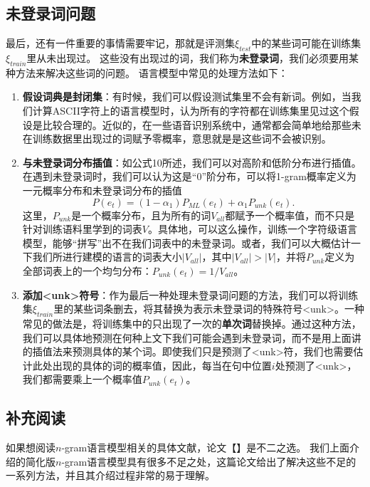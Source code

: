 \documentclass[10pt,a4paper]{ctexart}
\begin{document}
\subsection{未登录词问题}
最后，还有一件重要的事情需要牢记，那就是评测集$\xi_{test}$中的某些词可能在训练集$\xi_{train}$里从未出现过。
这些没有出现过的词，我们称为\textbf{未登录词}，我们必须要用某种方法来解决这些词的问题。
语言模型中常见的处理方法如下：
\begin{enumerate}
\item[] \textbf{假设词典是封闭集}：有时候，我们可以假设测试集里不会有新词。例如，当我们计算ASCII字符上的语言模型时，认为所有的字符都在训练集里见过这个假设是比较合理的。近似的，在一些语音识别系统中，通常都会简单地给那些未在训练数据里出现过的词赋予零概率，意思就是是这些词不会被识别。
\item[] \textbf{与未登录词分布插值}：如公式10所述，我们可以对高阶和低阶分布进行插值。在遇到未登录词时，我们可以认为这是“0”阶分布，可以将1-gram概率定义为一元概率分布和未登录词分布的插值\[ P(e_t) = (1 - \alpha_1)P_{ML}(e_t) + \alpha_1 P_{unk}(e_t).\]这里，$P_{unk}$是一个概率分布，且为所有的词$V_{all}$都赋予一个概率值，而不只是针对训练语料里学到的词表$V$。具体地，可以这么操作，训练一个字符级语言模型，能够“拼写”出不在我们词表中的未登录词。或者，我们可以大概估计一下我们所进行建模的语言的词表大小$|V_{all}|$，其中$|V_{all}| > |V|$，并将$P_{unk}$定义为全部词表上的一个均匀分布：$P_{unk}(e_t) = 1 / {V_{all}}$。
\item[] \textbf{添加<unk>符号}：作为最后一种处理未登录词问题的方法，我们可以将训练集$\xi_{train}$里的某些词条删去，将其替换为表示未登录词的特殊符号<unk>。一种常见的做法是，将训练集中的只出现了一次的\textbf{单次词}替换掉。通过这种方法，我们可以具体地预测在何种上文下我们可能会遇到未登录词，而不是用上面讲的插值法来预测具体的某个词。即使我们只是预测了<unk>符，我们也需要估计此处出现的具体的词的概率值，因此，每当在句中位置$i$处预测了<unk>，我们都需要乘上一个概率值$P_{unk}(e_t)$。
\end{enumerate}

\subsection{补充阅读}
如果想阅读$n$-gram语言模型相关的具体文献，论文【】是不二之选。
我们上面介绍的简化版$n$-gram语言模型具有很多不足之处，这篇论文给出了解决这些不足的一系列方法，并且其介绍过程非常的易于理解。
\end{document}
